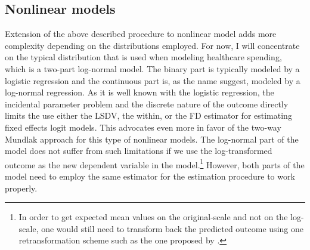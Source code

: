 \documentclass[11pt,letter]{article}
\begin{document}
\subsection{Nonlinear models}
Extension of the above described procedure to nonlinear model adds more complexity depending on the distributions employed. For now, I will concentrate on the typical distribution that is used when modeling healthcare spending, which is a two-part log-normal model. The binary part is typically modeled by a logistic regression and the continuous part is, as the name suggest, modeled by a log-normal regression. As it is well known with the logistic regression, the incidental parameter problem and the discrete nature of the outcome directly limits the use either the LSDV, the within, or the FD estimator for estimating fixed effects logit models. This advocates even more in favor of the two-way Mundlak approach for this type of nonlinear models. The log-normal part of the model does not suffer from such limitations if we use the log-transformed outcome as the new dependent variable in the model.\footnote{In order to get expected mean values on the original-scale and not on the log-scale, one would still need to transform back the predicted outcome using one retransformation scheme such as the one proposed by \cite{duan_smearing_1983}.} However, both parts of the model need to employ the same estimator for the estimation procedure to work properly.
\par
\end{document}

